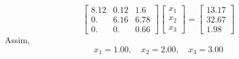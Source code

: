 \begin{resolution}
\begin{equation*}
\begin{bmatrix}
      8.12 & 0.12 & 1.6  \\
      0.   & 6.16 & 6.78 \\
      0.   & 0.   & 0.66
    \end{bmatrix}
    \begin{bmatrix}
      x_1 \\ x_2 \\ x_3
    \end{bmatrix} = \begin{bmatrix}
      13.17 \\
      32.67 \\
      1.98
    \end{bmatrix}
  \end{equation*}
  Assim,
  \begin{equation}
    x_1 = 1.00, \quad x_2 = 2.00, \quad x_3 = 3.00
  \end{equation}
\end{resolution}

